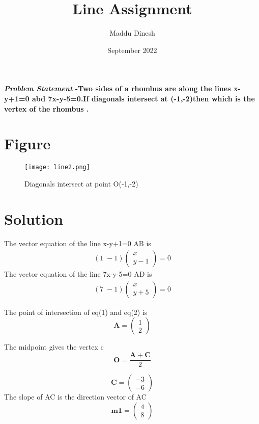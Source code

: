 \documentclass[journal,10pt,twocolumn]{article}
\title{\textbf{Line Assignment}}
\author{Maddu Dinesh}
\date{September 2022}
\let\vec\mathbf
\newcommand{\myvec}[1]{\ensuremath{\begin{pmatrix}#1\end{pmatrix}}}
\begin{document}
\maketitle
\paragraph{\textit{Problem Statement} -Two sides of a rhombus are along the lines x-y+1=0 abd 7x-y-5=0.If diagonals intersect at (-1,-2)then which is the vertex of the rhombus .}

\section*{\large Figure}

\begin{figure}[H]
\centering
\texttt{[image: line2.png]}
\caption{Diagonals intersect at point O(-1,-2)}
\label{fig:triangle}
\end{figure}
\section*{\large Solution}
The vector equation of the line x-y+1=0 AB is
\begin{eqnarray}
	(1\;-1)\myvec{x\\y-1}=0
\end{eqnarray}
The vector equation of the line 7x-y-5=0 AD is
\begin{eqnarray}
	 (7\;-1)\myvec{x\\y+5}=0
\end{eqnarray}



The point of intersection of  eq(1) and eq(2) is
\begin{equation}
\vec{A}=\myvec{1\\2}
\label{eq2}
\end{equation}

The midpoint gives the vertex c
\begin{equation}
\vec{O} = \frac{\vec{A}+\vec{C}}{2}
\label{eq3}
\end{equation}

\begin{equation}
	\vec{C} = \myvec{-3\\-6}
	\label{eq4}
\end{equation}
The slope of AC is the direction vector of AC
\begin{equation}
\vec{m1}=\myvec{4\\8}
\end{equation}
\end{document}
